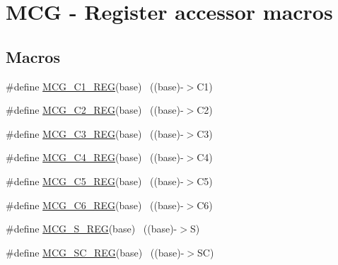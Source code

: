 \hypertarget{group___m_c_g___register___accessor___macros}{}\section{M\+CG -\/ Register accessor macros}
\label{group___m_c_g___register___accessor___macros}
\subsection*{Macros}
\begin{DoxyCompactItemize}
\item 
\#define \hyperlink{group___m_c_g___register___accessor___macros_gae34b03d76caea16a8366fb11838560ea}{M\+C\+G\+\_\+\+C1\+\_\+\+R\+EG}(base)                                              ~((base)-\/$>$C1)
\item 
\#define \hyperlink{group___m_c_g___register___accessor___macros_ga81f0c07fe9169d8b0d87c8dc497b4732}{M\+C\+G\+\_\+\+C2\+\_\+\+R\+EG}(base)                                              ~((base)-\/$>$C2)
\item 
\#define \hyperlink{group___m_c_g___register___accessor___macros_ga0a47f442b7ba0665e9536b8d187c2f92}{M\+C\+G\+\_\+\+C3\+\_\+\+R\+EG}(base)                                              ~((base)-\/$>$C3)
\item 
\#define \hyperlink{group___m_c_g___register___accessor___macros_ga8b1f5173fccdea7dfd4e2ea46db8002f}{M\+C\+G\+\_\+\+C4\+\_\+\+R\+EG}(base)                                              ~((base)-\/$>$C4)
\item 
\#define \hyperlink{group___m_c_g___register___accessor___macros_gaf5c35c53a6183c707c255e7a9aeaca49}{M\+C\+G\+\_\+\+C5\+\_\+\+R\+EG}(base)                                              ~((base)-\/$>$C5)
\item 
\#define \hyperlink{group___m_c_g___register___accessor___macros_gadbc313b8733938cb5efd4ffa9050d84b}{M\+C\+G\+\_\+\+C6\+\_\+\+R\+EG}(base)                                              ~((base)-\/$>$C6)
\item 
\#define \hyperlink{group___m_c_g___register___accessor___macros_ga69f3bd6d5a19734d5e76e9948464eb7b}{M\+C\+G\+\_\+\+S\+\_\+\+R\+EG}(base)                                                ~((base)-\/$>$S)
\item 
\#define \hyperlink{group___m_c_g___register___accessor___macros_ga5ac33230f450775fe7f50243d3c6daaf}{M\+C\+G\+\_\+\+S\+C\+\_\+\+R\+EG}(base)                                              ~((base)-\/$>$SC)

\end{DoxyCompactItemize}

